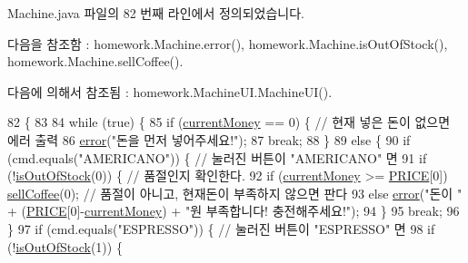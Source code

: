 Machine.\+java 파일의 82 번째 라인에서 정의되었습니다.



다음을 참조함 \+:  homework.\+Machine.\+error(), homework.\+Machine.\+is\+Out\+Of\+Stock(), homework.\+Machine.\+sell\+Coffee().



다음에 의해서 참조됨 \+:  homework.\+Machine\+U\+I.\+Machine\+U\+I().


\begin{DoxyCode}
82                                     \{
83         
84         \textcolor{keywordflow}{while} (\textcolor{keyword}{true}) \{
85             \textcolor{keywordflow}{if} (\hyperlink{classhomework_1_1_machine_a79f249f2701117b1e20977785536dad1}{currentMoney} == 0) \{ \textcolor{comment}{// 현재 넣은 돈이 없으면 에러 출력}
86                 \hyperlink{classhomework_1_1_machine_a1d7f4ae53f4a73b94c1f7948637abe56}{error}(\textcolor{stringliteral}{"돈을 먼저 넣어주세요!"}); 
87                 \textcolor{keywordflow}{break};
88             \}
89             \textcolor{keywordflow}{else} \{
90                 \textcolor{keywordflow}{if} (cmd.equals(\textcolor{stringliteral}{"AMERICANO"})) \{ \textcolor{comment}{// 눌러진 버튼이 "AMERICANO" 면}
91                     \textcolor{keywordflow}{if} (!\hyperlink{classhomework_1_1_machine_a7aea2c95a5444015f3cb1c0b69376852}{isOutOfStock}(0)) \{ \textcolor{comment}{// 품절인지 확인한다.}
92                         \textcolor{keywordflow}{if} (\hyperlink{classhomework_1_1_machine_a79f249f2701117b1e20977785536dad1}{currentMoney} >= \hyperlink{classhomework_1_1_machine_a7b0f75289547dfd0aa81f1d842d9c7e4}{PRICE}[0])  
      \hyperlink{classhomework_1_1_machine_a81525289e52f27b3451a180d19f26e33}{sellCoffee}(0); \textcolor{comment}{// 품절이 아니고, 현재돈이 부족하지 않으면 판다}
93                         \textcolor{keywordflow}{else}    \hyperlink{classhomework_1_1_machine_a1d7f4ae53f4a73b94c1f7948637abe56}{error}(\textcolor{stringliteral}{"돈이 "} + (\hyperlink{classhomework_1_1_machine_a7b0f75289547dfd0aa81f1d842d9c7e4}{PRICE}[0]-\hyperlink{classhomework_1_1_machine_a79f249f2701117b1e20977785536dad1}{currentMoney}) + \textcolor{stringliteral}{"원 부족합니다!
       충전해주세요!"});
94                     \}
95                     \textcolor{keywordflow}{break};
96                 \}
97                 \textcolor{keywordflow}{if} (cmd.equals(\textcolor{stringliteral}{"ESPRESSO"})) \{ \textcolor{comment}{// 눌러진 버튼이 "ESPRESSO" 면}
98                     \textcolor{keywordflow}{if} (!\hyperlink{classhomework_1_1_machine_a7aea2c95a5444015f3cb1c0b69376852}{isOutOfStock}(1)) \{

\end{DoxyCode}
